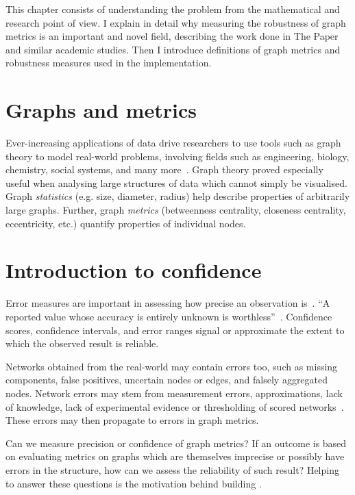 This chapter consists of understanding the problem from the mathematical and research point of view.
I explain in detail why measuring the robustness of graph metrics is an important and novel field, describing the work done in The Paper and similar academic studies.
Then I introduce definitions of graph metrics and robustness measures used in the implementation.


\section{Graphs and metrics}

Ever-increasing applications of data drive researchers to use tools such as graph theory to model real-world problems, involving fields such as engineering, biology, chemistry, social systems, and many more~\cite{FouldsGraphTheoryApplications2012}.
Graph theory proved especially useful when analysing large structures of data which cannot simply be visualised.
Graph \textsl{statistics} (e.g. size, diameter, radius) help describe properties of arbitrarily large graphs.
Further, graph \textsl{metrics} (betweenness centrality, closeness centrality, eccentricity, etc.) quantify properties of individual nodes.


\section{Introduction to confidence}

Error measures are important in assessing how precise an observation is~\cite{Curran-EverettExplorationsStatisticsStandard2008}.
\enquote{A reported value whose accuracy is entirely unknown is worthless}~\cite{EisenhartExpressionUncertaintiesFinal1968}.
Confidence scores, confidence intervals, and error ranges signal or approximate the extent to which the observed result is reliable.

Networks obtained from the real-world may contain errors too, such as missing components, false positives, uncertain nodes or edges, and falsely aggregated nodes.
Network errors may stem from measurement errors, approximations, lack of knowledge, lack of experimental evidence or thresholding of scored networks~\cite{Wang2012,MarsdenNetworkDataMeasurement1990,JonesChallengesLimitationsQuantifying2010}.
These errors may then propagate to errors in graph metrics.

Can we measure precision or confidence of graph metrics?
If an outcome is based on evaluating metrics on graphs which are themselves imprecise or possibly have errors in the structure, how can we assess the reliability of such result?
Helping to answer these questions is the motivation behind building \graffs.

